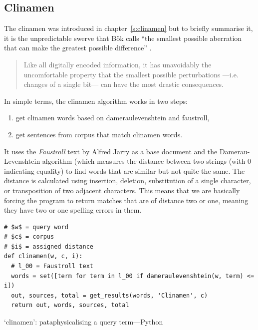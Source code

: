 \subsection{Clinamen}
\label{s:clinamenalgo}

The clinamen was introduced in chapter~\ref{s:clinamen} but to briefly summarise it, it is the unpredictable swerve that Bök calls ``the smallest possible aberration that can make the greatest possible difference'' \autocite*{Bok2002}.

\begin{quotation}
  Like all digitally encoded information, it has unavoidably the uncomfortable property that the smallest possible perturbations —i.e. changes of a single bit— can have the most drastic consequences. 
\end{quotation}

In simple terms, the clinamen algorithm works in two steps:
\begin{enumerate}
  \item get clinamen words based on dameraulevenshtein and faustroll,
  \item get sentences from corpus that match clinamen words.
\end{enumerate}

It uses the \textit{Faustroll} text by Alfred Jarry \autocite*{Jarry1996} as a base document and the Damerau-Levenshtein algorithm \autocite{Damerau1964, Levenshtein1966} (which measures the distance between two strings (with \num{0} indicating equality) to find words that are similar but not quite the same. The distance is calculated using insertion, deletion, substitution of a single character, or transposition of two adjacent characters. This means that we are basically forcing the program to return matches that are of distance two or one, meaning they have two or one spelling errors in them.

\begin{listing}[!htbp] %
  \begin{verbatim}
# $w$ = query word
# $c$ = corpus
# $i$ = assigned distance
def clinamen(w, c, i):
  # l_00 = Faustroll text
  words = set([term for term in l_00 if dameraulevenshtein(w, term) <= i])
  out, sources, total = get_results(words, 'Clinamen', c)
  return out, words, sources, total
  \end{verbatim}
\caption[`clinamen' function---Python]{`clinamen': pataphysicalising a query term---Python}
\label{code:clinamen}
\end{listing}

